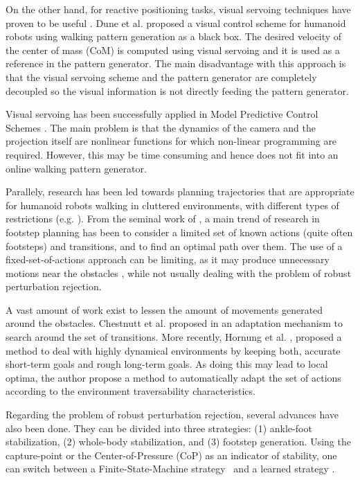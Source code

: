 On the other hand, for reactive positioning tasks, visual servoing techniques have proven to be useful \citep{ChaumetteRAM2006, ChaumetteRAM2007}. Dune et al. \citep{DuneIROS2010} proposed a visual control scheme for humanoid robots using walking pattern generation as a black box. The desired velocity of the center of mass (CoM) is computed using visual servoing and it is used as a reference in the pattern generator. The main disadvantage with this approach is that the visual servoing scheme and the pattern generator are completely decoupled so the visual information is not directly feeding the pattern generator.

Visual servoing has been successfully applied in Model Predictive Control Schemes \citep{Allibert2010}. The main problem is that the dynamics of the camera and the projection itself are nonlinear functions for which non-linear programming are required. However, this may be time consuming and hence does not fit into an online walking pattern generator.

Parallely, research has been led towards planning trajectories that are appropriate for humanoid robots walking in cluttered environments, with different types of restrictions (e.g. \citep{Chestnutt2005, jib-IJHR2010}). 
From the seminal work of \citep{Chestnutt2005}, a main trend of research in footstep planning has been to consider a limited set of known actions (quite often footsteps) and transitions, and to find an optimal path over them. The use of a fixed-set-of-actions approach can be limiting, as it may produce unnecessary motions near the obstacles \citep{Bourgeot:IROS:2002}, while not usually dealing with the problem of robust perturbation rejection. 

A vast amount of work exist to lessen the amount of movements generated around the obstacles. Chestnutt et al. proposed in \citep{Chestnutt:ICRA:2007} an adaptation mechanism to search around the set of transitions. More recently, Hornung et al. \citep{Hornung:ICRA:2012}, proposed a method to deal with highly dynamical environments by keeping both, accurate short-term goals and rough long-term goals. As doing this may lead to local optima, the author propose a method to automatically adapt the set of actions according to the environment traversability characteristics. 

Regarding the problem of robust perturbation rejection, several advances have also been done. They can be divided into three strategies: (1) ankle-foot stabilization, (2) whole-body stabilization, and (3) footstep generation. 
Using the capture-point or the Center-of-Pressure (CoP) as an indicator of stability, one can switch between a Finite-State-Machine strategy~\citep{Nishiwaki:ijrr:2009} and a learned strategy \citep{SeungJoon:ichr:2011}.

